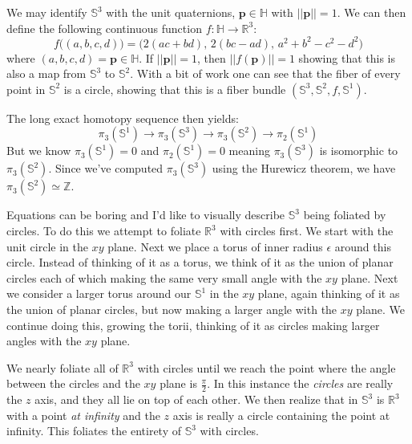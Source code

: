 \documentclass{beamer}
\begin{document}
    \begin{frame}
        We may identify $\mathbb{S}^{3}$ with the unit quaternions,
        $\mathbf{p}\in\mathbb{H}$ with $||\mathbf{p}||=1$. We can then define
        the following continuous function
        $f:\mathbb{H}\rightarrow\mathbb{R}^{3}$:
        \begin{equation}
            f\big((a,b,c,d)\big)
                =\big(2(ac+bd),\,2(bc-ad),\,a^{2}+b^{2}-c^{2}-d^{2}\big)
        \end{equation}
        where $(a,b,c,d)=\mathbf{p}\in\mathbb{H}$. If $||\mathbf{p}||=1$, then
        $||f(\mathbf{p})||=1$ showing that this is also a map from
        $\mathbb{S}^{3}$ to $\mathbb{S}^{2}$. With a bit of work one can see
        that the fiber of every point in $\mathbb{S}^{2}$ is a circle, showing
        that this is a fiber bundle
        $(\mathbb{S}^{3},\mathbb{S}^{2},f,\mathbb{S}^{1})$.
    \end{frame}
    \begin{frame}
        The long exact homotopy sequence then yields:
        \begin{equation}
            \pi_{3}(\mathbb{S}^{1})\rightarrow\pi_{3}(\mathbb{S}^{3})
            \rightarrow\pi_{3}(\mathbb{S}^{2})\rightarrow\pi_{2}(\mathbb{S}^{1})
        \end{equation}
        But we know $\pi_{3}(\mathbb{S}^{1})=0$ and
        $\pi_{2}(\mathbb{S}^{1})=0$ meaning
        $\pi_{3}(\mathbb{S}^{3})$ is isomorphic to
        $\pi_{3}(\mathbb{S}^{2})$. Since we've computed
        $\pi_{3}(\mathbb{S}^{3})$ using the Hurewicz theorem, we have
        $\pi_{3}(\mathbb{S}^{2})\simeq\mathbb{Z}$.
    \end{frame}
    \begin{frame}
        Equations can be boring and I'd like to visually describe
        $\mathbb{S}^{3}$ being foliated by circles. To do this we attempt to
        foliate $\mathbb{R}^{3}$ with circles first. We start with the unit
        circle in the $xy$ plane. Next we place a torus of inner radius
        $\epsilon$ around this circle. Instead of thinking of it as a torus,
        we think of it as the union of planar circles each of which making the
        same very small angle with the $xy$ plane. Next we consider a larger
        torus around our $\mathbb{S}^{1}$ in the $xy$ plane, again thinking of
        it as the union of planar circles, but now making a larger angle with
        the $xy$ plane. We continue doing this, growing the torii, thinking of
        it as circles making larger angles with the $xy$ plane.
        \par\hfill\par
        We nearly foliate all of $\mathbb{R}^{3}$ with circles until we reach
        the point where the angle between the circles and the $xy$ plane is
        $\frac{\pi}{2}$. In this instance the \textit{circles} are really the
        $z$ axis, and they all lie on top of each other. We then realize that
        in $\mathbb{S}^{3}$ is $\mathbb{R}^{3}$ with a point
        \textit{at infinity} and the $z$ axis is really a circle containing
        the point at infinity. This foliates the entirety of $\mathbb{S}^{3}$
        with circles.
    \end{frame}
\end{document}
